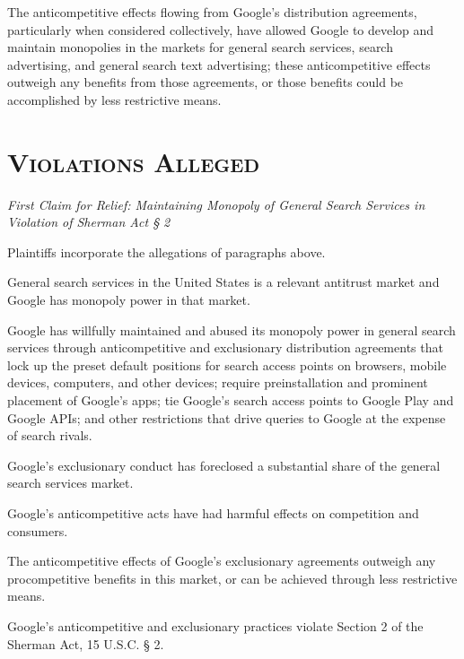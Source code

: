 \documentclass[11pt,b5paper,headings=small]{scrartcl}
\begin{document}
The anticompetitive effects flowing from Google’s distribution agreements,
particularly when considered collectively, have allowed Google to develop and maintain
monopolies in the markets for general search services, search advertising, and general search text
advertising; these anticompetitive effects outweigh any benefits from those agreements, or those
benefits could be accomplished by less restrictive means.
\section{\textsc{Violations Alleged}}
\textit{First Claim for Relief: Maintaining Monopoly of General Search Services in Violation of
Sherman Act § 2}


Plaintiffs incorporate the allegations of paragraphs above.


General search services in the United States is a relevant antitrust market and
Google has monopoly power in that market.


Google has willfully maintained and abused its monopoly power in general search
services through anticompetitive and exclusionary distribution agreements that lock up the preset
default positions for search access points on browsers, mobile devices, computers, and other
devices; require preinstallation and prominent placement of Google’s apps; tie Google’s search
access points to Google Play and Google APIs; and other restrictions that drive queries to
Google at the expense of search rivals.


Google’s exclusionary conduct has foreclosed a substantial share of the general
search services market.


Google’s anticompetitive acts have had harmful effects on competition and
consumers.


The anticompetitive effects of Google’s exclusionary agreements outweigh any
procompetitive benefits in this market, or can be achieved through less restrictive means.


Google’s anticompetitive and exclusionary practices violate Section 2 of the
Sherman Act, 15 U.S.C. § 2.
\end{document}
